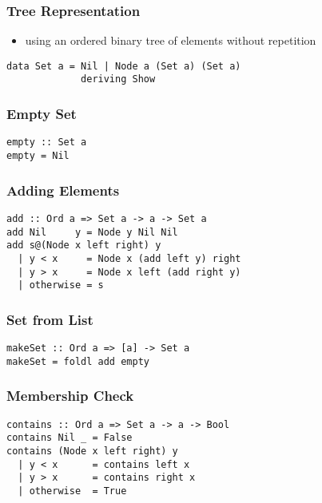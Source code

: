 \documentclass[dvipsnames]{beamer}
\theoremstyle{plain}
\begin{document}
\begin{frame}[fragile]
  \frametitle{Tree Representation}

  \begin{itemize}
    \item using an ordered binary tree of elements without repetition
  \end{itemize}

  \begin{exampleblock}{}
    \begin{lstlisting}
data Set a = Nil | Node a (Set a) (Set a)
             deriving Show
    \end{lstlisting}
  \end{exampleblock}
\end{frame}

\begin{frame}[fragile]
  \frametitle{Empty Set}

  \begin{lstlisting}
empty :: Set a
empty = Nil
  \end{lstlisting}
\end{frame}

\begin{frame}[fragile]
  \frametitle{Adding Elements}

  \begin{lstlisting}[deletekeywords={insert}]
add :: Ord a => Set a -> a -> Set a
add Nil     y = Node y Nil Nil
add s@(Node x left right) y
  | y < x     = Node x (add left y) right
  | y > x     = Node x left (add right y)
  | otherwise = s
  \end{lstlisting}
\end{frame}

\begin{frame}[fragile]
  \frametitle{Set from List}

  \begin{lstlisting}
makeSet :: Ord a => [a] -> Set a
makeSet = foldl add empty
  \end{lstlisting}
\end{frame}

\begin{frame}[fragile]
  \frametitle{Membership Check}

  \begin{lstlisting}
contains :: Ord a => Set a -> a -> Bool
contains Nil _ = False
contains (Node x left right) y
  | y < x      = contains left x
  | y > x      = contains right x
  | otherwise  = True
  \end{lstlisting}
\end{frame}
\end{document}
